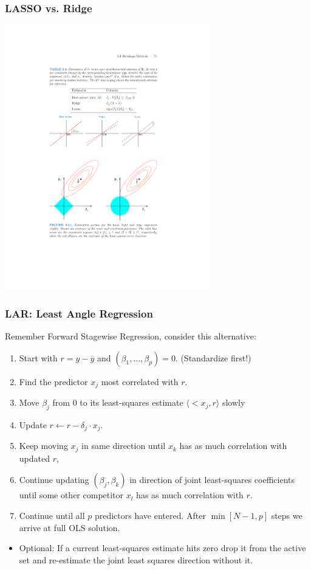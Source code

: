 \documentclass[xcolor=pdftex,dvipsnames,table,mathserif]{beamer}
\begin{document}
\begin{frame}
\frametitle{LASSO vs. Ridge}
\begin{center}
\includegraphics[width=3.5in]{./resources/orthcompare}
\end{center}
\end{frame}


\begin{frame}
\frametitle{LAR: Least Angle Regression}
Remember Forward Stagewise Regression, consider this alternative:
\begin{enumerate}
\item Start with $r= y-\overline{y}$ and $(\beta_1, \ldots, \beta_p) = 0$. (Standardize first!)
\item Find the predictor $x_j$ most correlated with $r$.
\item Move $\beta_j$ from 0 to its least-squares estimate $\langle<x_j , r \rangle$ slowly
\item Update $r \leftarrow r - \delta_j \cdot x_j$.
\item Keep moving $x_j$ in same direction until $x_k$ has as much correlation with updated $r$,
\item Continue updating $(\beta_j, \beta_k)$ in direction of \alert{joint} least-squares coefficients until some other competitor $x_l$ has as much correlation with $r$.
\item Continue until all $p$ predictors have entered. After $\min[N-1,p]$ steps we arrive at full OLS solution.
\end{enumerate}
\begin{itemize}
\item \alert{Optional:} If a current least-squares estimate hits zero drop it from the active set and re-estimate the joint least squares direction without it.
\end{itemize}
\end{frame}
\end{document}
